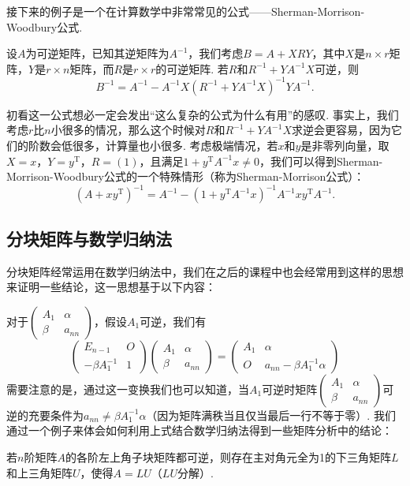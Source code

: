 接下来的例子是一个在计算数学中非常常见的公式——Sherman-Morrison-Woodbury公式.
\begin{example}{}{}
    设$A$为可逆矩阵，已知其逆矩阵为$A^{-1}$，我们考虑$B=A+XRY$，其中$X$是$n\times r$矩阵，$Y$是$r\times n$矩阵，而$R$是$r\times r$的可逆矩阵. 若$R$和$R^{-1}+YA^{-1}X$可逆，则
    \[B^{-1}=A^{-1}-A^{-1}X(R^{-1}+YA^{-1}X)^{-1}YA^{-1}.\]
\end{example}

\begin{solution}

\end{solution}

初看这一公式想必一定会发出``这么复杂的公式为什么有用''的感叹. 事实上，我们考虑$r$比$n$小很多的情况，那么这个时候对$R$和$R^{-1}+YA^{-1}X$求逆会更容易，因为它们的阶数会低很多，计算量也小很多. 考虑极端情况，若$x$和$y$是非零列向量，取$X=x$，$Y=y^\mathrm{T}$，$R=(1)$，且满足$1+y^\mathrm{T}A^{-1}x\neq 0$，我们可以得到Sherman-Morrison-Woodbury公式的一个特殊情形（称为Sherman-Morrison公式）：
\[(A+xy^\mathrm{T})^{-1}=A^{-1}-(1+y^\mathrm{T}A^{-1}x)^{-1}A^{-1}xy^\mathrm{T}A^{-1}.\]

\subsection{分块矩阵与数学归纳法}

分块矩阵经常运用在数学归纳法中，我们在之后的课程中也会经常用到这样的思想来证明一些结论，这一思想基于以下内容：

对于$\begin{pmatrix}
        A_1 & \alpha \\ \beta & a_{nn}
    \end{pmatrix}$，假设$A_1$可逆，我们有
\[\begin{pmatrix}
        E_{n-1} & O \\ -\beta A_1^{-1} & 1
    \end{pmatrix}\begin{pmatrix}
        A_1 & \alpha \\ \beta & a_{nn}
    \end{pmatrix}=\begin{pmatrix}
        A_1 & \alpha \\ O & a_{nn}-\beta A_1^{-1}\alpha
    \end{pmatrix}\]
需要注意的是，通过这一变换我们也可以知道，当$A_1$可逆时矩阵$\begin{pmatrix}
        A_1 & \alpha \\ \beta & a_{nn}
    \end{pmatrix}$可逆的充要条件为$a_{nn}\neq \beta A_1^{-1}\alpha$（因为矩阵满秩当且仅当最后一行不等于零）. 我们通过一个例子来体会如何利用上式结合数学归纳法得到一些矩阵分析中的结论：
\begin{example}{}{}
    若$n$阶矩阵$A$的各阶左上角子块矩阵都可逆，则存在主对角元全为1的下三角矩阵$L$和上三角矩阵$U$，使得$A=LU$（$LU$分解）.
\end{example}

